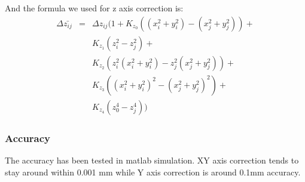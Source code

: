 And the formula we used for z axis correction is:
\begin{eqnarray}
  \Delta{\bar{z_{ij}}} & = & \Delta{z_{ij}}(1 + K_{z_0}((x_i^2 + y_i^2) - (x_j^2 + y_j^2)) + \nonumber\\
  & & K_{z_1}(z_i^2 - z_j^2) + \nonumber\\
  & & K_{z_2}(z_i^2(x_i^2 + y_i^2)- z_j^2(x_j^2 + y_j^2)) + \nonumber\\
  & & K_{z_3}((x_i^2 + y_i^2)^2 - (x_j^2 + y_j^2)^2) + \nonumber\\
  & & K_{z_4}(z_0^4 - z_j^4))  
\end{eqnarray}

\subsubsection{Accuracy}

The accuracy has been tested in matlab simulation. XY axis correction tends to stay around within 0.001 mm
while Y axis correction is around 0.1mm accuracy.

